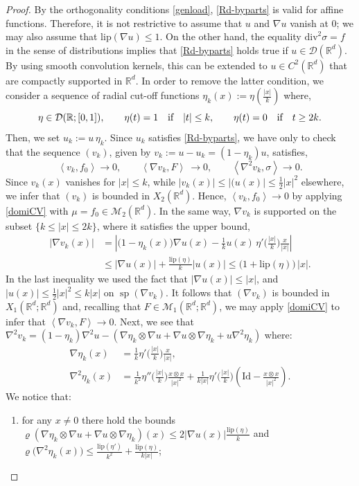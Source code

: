\documentclass[10pt,a4paper]{amsart}
\DeclareMathOperator{\spt}{sp}
\newcommand{\D}{\mathcal{D}}
\newcommand{\Lip}{{\mathrm{lip}}}
\newcommand{\Mes}{{\mathcal{M}}}
\newcommand{\Rd}{\R^d}
\newcommand{\R}{\mathbb{R}}
\newcommand{\abs}[1]{{\left \lvert #1 \right \rvert}}
\newcommand{\dive}{{\mathrm{div}}}
\newcommand{\pairing}[1]{{\left \langle #1 \right \rangle}}
\begin{document}
\begin{proof} By the orthogonality conditions \eqref{genload}, \eqref{Rd-byparts} is valid for affine functions. Therefore, it is not restrictive to assume that $u$ and $\nabla u$ vanish at $0$; we may also assume that $\Lip(\nabla u)\le 1$.
On the other hand, the  equality $\dive^2\sigma=f$ in the sense of distributions implies that  \eqref{Rd-byparts} holds true if $u\in \D(\R^d)$. By using smooth convolution kernels, this can be extended to $u\in C^2(\R^d)$ that are compactly supported in $\R^d$. In order to remove the latter condition,   we consider a sequence of radial  cut-off functions $\eta_k(x) := \eta(\frac{|x|}{k})$ where,
 $$\eta\in \D(\R;[0,1]),\qquad \eta(t)=1 \quad \text{if\quad$|t|\le k$} ,\qquad \eta(t)=0 \quad \text{if\quad$t\ge 2k$}.$$
Then, we set $u_k := u\, \eta_k$.  Since  $u_k $  satisfies  \eqref{Rd-byparts}, we have only to check that the sequence $(v_k)$, given by $v_k := u- u_k= (1-\eta_k) u$,    satisfies,
\begin{equation}\label{claim-truncature}
\pairing{v_k,f_0}\to 0,\qquad \pairing{\nabla v_k,F}\ \to 0, \qquad \pairing{\nabla^2 v_k,\sigma} \to 0 .
\end{equation}
Since $v_k(x)$ vanishes for $|x|\le k$, while $|v_k(x)| \le |(u(x)| \le \frac1{2} |x|^2$  elsewhere, we infer that 
$(v_k)$ is bounded in $X_2(\R^d)$. Hence, $\pairing{v_k,f_0}\to 0 $ by applying \eqref{domiCV} with $\mu=f_0 \in \Mes_2(\R^d)$.
In the same way, $\nabla v_k$ is supported on the subset $\{k\le |x|\le 2k\}$, where it satisfies the upper bound,
\begin{align*}
	|\nabla v_k(x)| &= \left|\big(1-\eta_k(x)\big) \nabla u(x) -  \frac1{k}  u(x)\,  \eta' \Big(\frac{|x|}{k}\Big) \frac{x}{\abs{x}}\right| \\
	&\le |\nabla u(x)| + \frac{\Lip(\eta)}{k} |u(x)|  \le \big(1 +  \Lip(\eta)\big)\, |x| .
\end{align*}
In the last inequality we used the fact that $|\nabla u(x)| \le |x|$, and  $  |u(x)| \le \frac1{2} |x|^2 \le k |x| $
on $\spt (\nabla v_k)$. 
It follows that  $(\nabla v_k)$ is bounded in $X_1(\R^d;\Rd)$ and, recalling that  $F\in \Mes_1(\R^d;\R^d)$, we may apply 
\eqref{domiCV} to infer that $\pairing{\nabla v_k,F} \to 0$.
Next,  we see that\  $\nabla^2 v_k= (1-\eta_k) \nabla^2 u  - (\nabla \eta_k \otimes \nabla u +\nabla u\otimes \nabla \eta_k
+ u  \nabla^2 \eta_k)$ where:
\begin{align*}
	\nabla  \eta_k (x) &=  \frac1{k} \eta'\Big(\frac{|x|}{k}\Big) \frac{x}{|x|},\\
	 \nabla^2 \eta_k(x) &=\frac1{k^2} \eta''\Big(\frac{|x|}{k}\Big) \frac{x\otimes x}{|x|^2} + \frac1{k|x|} \eta' \Big(\frac{|x|}{k}\Big)\left( \mathrm{Id} - \frac{x\otimes x}{|x|^2}\right).
\end{align*}
 We notice  that:
 \begin{enumerate}
\item[-] for any $x \neq 0$ there hold the bounds $\varrho(\nabla \eta_k \otimes \nabla u +\nabla u\otimes \nabla \eta_k)(x) \le 2|\nabla u(x)|\frac{\Lip(\eta)}{k}$ and $\varrho\big(\nabla^2 \eta_k(x)\big) \leq \frac{\Lip(\eta')}{k^2} + \frac{\Lip(\eta)}{k \abs{x}}$;



\end{enumerate}
\end{proof}
\end{document}
